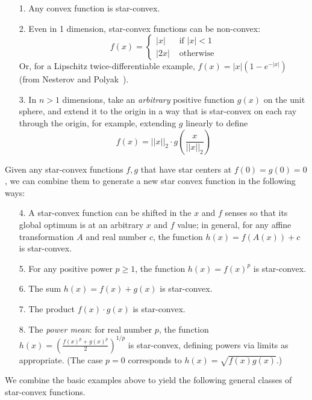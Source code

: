 \documentclass[11pt,letter]{article}
\numberwithin{nTheorems}{section}
\begin{document}
\medskip{}
\begin{itemize}
  \item[1.] Any convex function is star-convex.
  \item[2.] Even in 1 dimension, star-convex functions can be non-convex: \[f(x)=\begin{cases}
    |x| & \text{ if } |x|<1\\
    |2x| & \text{ otherwise}
  \end{cases}\]
  Or, for a Lipschitz twice-differentiable example, $f(x)=|x|(1-e^{-|x|})$ (from Nesterov and Polyak~\cite{Nesterov:2006}).
  \item[3.] In $n>1$ dimensions, take an \emph{arbitrary} positive function $g(x)$ on the unit sphere, and extend it to the origin in a way that is star-convex on each ray through the origin, for example, extending $g$ linearly to define \[f(x)=||x||_2\cdot g\left(\frac{x}{||x||_2}\right)\]
\end{itemize}


\medskip{}
Given any star-convex functions $f,g$ that have star centers at $f(0)=g(0)=0$, we can combine them to generate a new star convex function in the following ways:
\begin{itemize}
  \item[4.] A star-convex function can be shifted in the $x$ and $f$ senses so that its global optimum is at an arbitrary $x$ and $f$ value; in general, for any affine transformation $A$ and real number $c$, the function $h(x)=f(A(x))+c$ is star-convex.
  \item[5.] For any positive power $p\geq 1$, the function $h(x)=f(x)^p$ is star-convex.
  \item[6.] The sum $h(x)=f(x)+g(x)$ is star-convex.
  \item[7.] The product $f(x)\cdot g(x)$ is star-convex.
  \item[8.] The \emph{power mean}: for real number $p$, the function $h(x)=\left(\frac{f(x)^p+g(x)^p}{2}\right)^{1/p}$ is star-convex, defining powers via limits as appropriate. (The case $p=0$ corresponds to $h(x)=\sqrt{f(x)g(x)}$.)
\end{itemize}

\medskip{}

We combine the basic examples above to yield the following general classes of star-convex functions.
\end{document}
